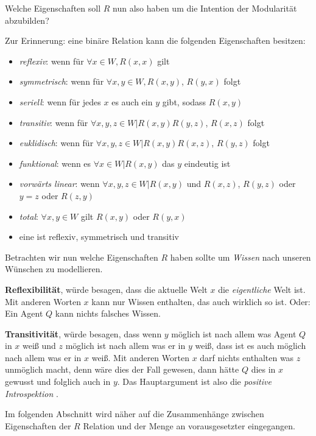 Welche Eigenschaften soll $R$ nun also haben um die Intention der Modularität abzubilden?

Zur Erinnerung: eine binäre Relation kann die folgenden Eigenschaften besitzen:
\begin{itemize}
	\item \emph{reflexiv}: wenn für $\forall x \in W, R(x,x)$ gilt
	\item \emph{symmetrisch}: wenn für $\forall x,y \in W, R(x,y)$, $R(y,x)$ folgt
	\item \emph{seriell}: wenn für jedes $x$ es auch ein $y$ gibt, sodass $R(x,y)$
	\item \emph{transitiv}: wenn für $\forall x,y,z \in W | R(x,y) R(y,z)$, $R(x,z)$ folgt
	\item \emph{euklidisch}: wenn für $\forall x,y,z \in W | R(x,y) R(x,z)$, $R(y,z)$ folgt
	\item \emph{funktional}: wenn es $\forall x \in W | R(x,y)$ das $y$ eindeutig ist
	\item \emph{vorwärts linear}: wenn $\forall x,y,z \in W | R(x,y)$ und $R(x,z)$, $R(y,z)$ oder $y=z$ oder $R(z,y)$
	\item \emph{total}: $\forall x,y \in W$ gilt $R(x,y)$ oder $R(y,x)$
	\item eine \emph{\EQRef} ist reflexiv, symmetrisch und transitiv
\end{itemize}

Betrachten wir nun welche Eigenschaften $R$ haben sollte um \emph{Wissen} nach unseren Wünschen zu modellieren.

\textbf{Reflexibilität}, würde besagen, dass die aktuelle Welt $x$ die \emph{eigentliche} Welt ist.
Mit anderen Worten $x$ kann nur Wissen enthalten, das auch wirklich so ist.
Oder: Ein Agent $Q$ kann nichts falsches Wissen.

\textbf{Transitivität}, würde besagen, dass wenn $y$ möglich ist nach allem was Agent $Q$ in $x$ weiß und $z$ möglich ist nach allem was er in $y$ weiß, dass ist es auch möglich nach allem was er in $x$ weiß.
Mit anderen Worten $x$ darf nichts enthalten was $z$ unmöglich macht, denn wäre dies der Fall gewesen, dann hätte $Q$ dies in $x$ gewusst und folglich auch in $y$.
Das Hauptargument ist also die \emph{positive Introspektion} \vierFormel {}.

Im folgenden Abschnitt wird näher auf die Zusammenhänge zwischen Eigenschaften der $R$ Relation und der Menge an vorausgesetzter \formelSchemata eingegangen.







